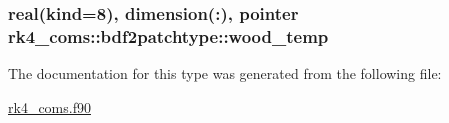 \subsubsection[{\texorpdfstring{wood\+\_\+temp}{wood_temp}}]{\setlength{\rightskip}{0pt plus 5cm}real(kind=8), dimension(\+:), pointer rk4\+\_\+coms\+::bdf2patchtype\+::wood\+\_\+temp}\hypertarget{structrk4__coms_1_1bdf2patchtype_a760e813763073c0ebbcc9768d2d85b92}{}\label{structrk4__coms_1_1bdf2patchtype_a760e813763073c0ebbcc9768d2d85b92}


The documentation for this type was generated from the following file\+:\begin{DoxyCompactItemize}
\item 
\hyperlink{rk4__coms_8f90}{rk4\+\_\+coms.\+f90}\end{DoxyCompactItemize}

